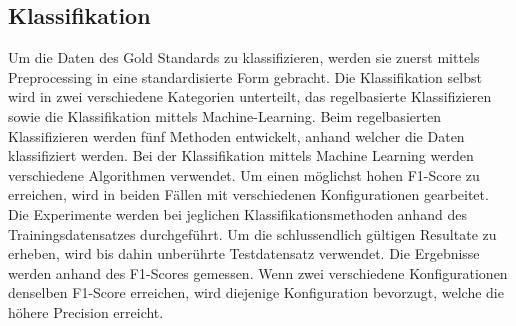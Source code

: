 \subsection{Klassifikation}
Um die Daten des Gold Standards zu klassifizieren, werden sie zuerst mittels Preprocessing in eine standardisierte Form gebracht.
Die Klassifikation selbst wird in zwei verschiedene Kategorien unterteilt, das regelbasierte Klassifizieren sowie die Klassifikation mittels Machine-Learning.
Beim regelbasierten Klassifizieren werden fünf Methoden entwickelt, anhand welcher die Daten klassifiziert werden.
Bei der Klassifikation mittels Machine Learning werden verschiedene Algorithmen verwendet.
Um einen möglichst hohen F1-Score zu erreichen, wird in beiden Fällen mit verschiedenen Konfigurationen gearbeitet.\\
Die Experimente werden bei jeglichen Klassifikationsmethoden anhand des Trainingsdatensatzes durchgeführt.
Um die schlussendlich gültigen Resultate zu erheben, wird bis dahin unberührte Testdatensatz verwendet.
Die Ergebnisse werden anhand des F1-Scores gemessen.
Wenn zwei verschiedene Konfigurationen denselben F1-Score erreichen, wird diejenige Konfiguration bevorzugt, welche die höhere Precision erreicht.
